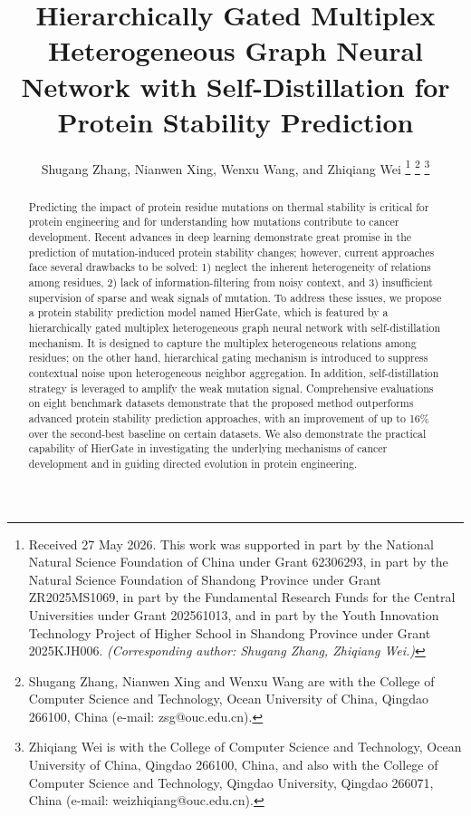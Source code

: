 \documentclass[journal,twoside,web]{ieeecolor}
\begin{document}
\title{Hierarchically Gated Multiplex Heterogeneous Graph Neural Network with Self-Distillation for Protein Stability Prediction}

\author{Shugang Zhang, Nianwen Xing, Wenxu Wang, and Zhiqiang Wei
\thanks{Received 27 May 2026. This work was supported in part by the National Natural Science Foundation of China under Grant 62306293, in part by the Natural Science Foundation of Shandong Province under Grant ZR2025MS1069, in part by the Fundamental Research Funds for the Central Universities under Grant 202561013, and in part by the Youth Innovation Technology Project of Higher School in Shandong Province under Grant 2025KJH006. \textit{(Corresponding author: Shugang Zhang, Zhiqiang Wei.)}}
\thanks{Shugang Zhang, Nianwen Xing and Wenxu Wang are with the College of Computer Science and Technology, Ocean University of China, Qingdao 266100, China (e-mail: zsg@ouc.edu.cn).}
\thanks{Zhiqiang Wei is with the College of Computer Science and Technology, Ocean University of China, Qingdao 266100, China, and also with the College of Computer Science and Technology, Qingdao University, Qingdao 266071, China (e-mail: weizhiqiang@ouc.edu.cn).}}

\maketitle

\begin{abstract}
Predicting the impact of protein residue mutations on thermal stability is critical for protein engineering and for understanding how mutations contribute to cancer development. Recent advances in deep learning demonstrate great promise in the prediction of mutation-induced protein stability changes; however, current approaches face several drawbacks to be solved: 1) neglect the inherent heterogeneity of relations among residues, 2) lack of information-filtering from noisy context, and 3) insufficient supervision of sparse and weak signals of mutation. To address these issues, we propose a protein stability prediction model named HierGate, which is featured by a hierarchically gated multiplex heterogeneous graph neural network with self-distillation mechanism. It is designed to capture the multiplex heterogeneous relations among residues; on the other hand, hierarchical gating mechanism is introduced to suppress contextual noise upon heterogeneous neighbor aggregation. In addition, self-distillation strategy is leveraged to amplify the weak mutation signal. Comprehensive evaluations on eight benchmark datasets demonstrate that the proposed method outperforms advanced protein stability prediction approaches, with an improvement of up to 16\% over the second-best baseline on certain datasets. We also demonstrate the practical capability of HierGate in investigating the underlying mechanisms of cancer development and in guiding directed evolution in protein engineering.
\end{abstract}
\end{document}
